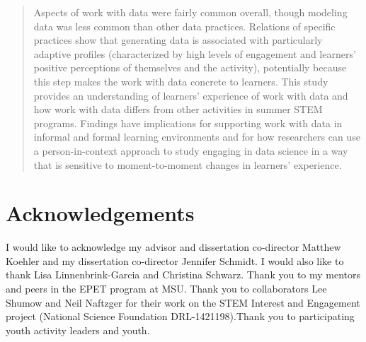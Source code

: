 \documentclass[]{msu-thesis}
\theoremstyle{definition}
\theoremstyle{definition}
\theoremstyle{definition}
\theoremstyle{remark}
\begin{document}
\begin{abstract}
Aspects of work with data were fairly common overall, though modeling data was less common than other data practices. Relations of specific practices show that generating data is associated with particularly adaptive profiles (characterized by high levels of engagement and learners' positive perceptions of themselves and the activity), potentially because this step makes the work with data concrete to learners. This study provides an understanding of learners' experience of work with data and how work with data differs from other activities in summer STEM programs. Findings have implications for supporting work with data in informal and formal learning environments and for how researchers can use a person-in-context approach to study engaging in data science in a way that is sensitive to moment-to-moment changes in learners' experience.

\end{abstract}

\clearpage

\makecopyrightpage

%
\makededicationpage
%
\clearpage

\chapter*{Acknowledgements}
\DoubleSpacing %
I would like to acknowledge my advisor and dissertation co-director Matthew Koehler and my dissertation co-director Jennifer Schmidt. I would also like to thank Lisa Linnenbrink-Garcia and Christina Schwarz. Thank you to my mentors and peers in the EPET program at MSU. Thank you to collaborators Lee Shumow and Neil Naftzger for their work on the STEM Interest and Engagement project (National Science Foundation DRL-1421198).Thank you to participating youth activity leaders and youth.
\clearpage

\SingleSpacing
\tableofcontents* %
\clearpage
\listoftables %
\clearpage
\listoffigures %
\mainmatter
%
\end{document}
